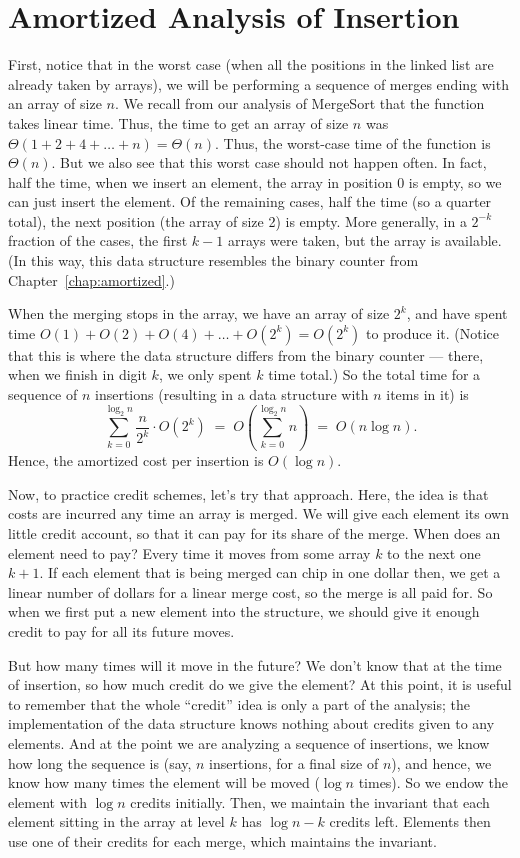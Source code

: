 \section{Amortized Analysis of Insertion}

First, notice that in the worst case (when all the positions in the
linked list are already taken by arrays), we will be performing a
sequence of merges ending with an array of size $n$. 
We recall from our analysis of MergeSort that the 
function takes linear time. Thus, the time to get an array of size $n$
was $\Theta(1+2+4+\ldots+n) = \Theta(n)$.
Thus, the worst-case time of the  function is $\Theta(n)$.
But we also see that this worst case should not happen often.
In fact, half the time, when we insert an element, the array in
position 0 is empty, so we can just insert the element.
Of the remaining cases, half the time (so a quarter total), the next
position (the array of size 2) is empty.
More generally, in a $2^{-k}$ fraction of the cases, the first $k-1$
arrays were taken, but the  array is available.
(In this way, this data structure resembles the binary counter from
Chapter~\ref{chap:amortized}.)

When the merging stops in the  array, we have an array of size
$2^k$, and have spent time $O(1)+O(2)+O(4)+\ldots+O(2^k) = O(2^k)$ to
produce it. (Notice that this is where the data structure differs from
the binary counter --- there, when we finish in digit $k$, we only
spent $k$ time total.) 
So the total time for a sequence of $n$ insertions (resulting in a
data structure with $n$ items in it) is
\[ \sum_{k=0}^{\log_2 n} \frac{n}{2^k} \cdot O(2^k)
\; = \; O(\sum_{k=0}^{\log_2 n} n) \; = \; O(n \log n). \]
Hence, the amortized cost per insertion is $O(\log n)$.

\smallskip

Now, to practice credit schemes, let's try that approach.
Here, the idea is that costs are incurred any time an array is merged. 
We will give each element its own little credit account, so
that it can pay for its share of the merge.
When does an element need to pay? 
Every time it moves from some array $k$ to the next one $k+1$.
If each element that is being merged can chip in one dollar then, we
get a linear number of dollars for a linear merge cost, so the merge
is all paid for. 
So when we first put a new element into the structure, we should give
it enough credit to pay for all its future moves.

But how many times will it move in the future? We don't know that at
the time of insertion, so how much credit do we give the element?
At this point, it is useful to remember that the whole ``credit'' idea
is only a part of the analysis; the implementation of the data
structure knows nothing about credits given to any elements.
And at the point we are analyzing a sequence of insertions, we know
how long the sequence is (say, $n$ insertions, for a final size of $n$), 
and hence, we know how many times the element will be moved ($\log n$
times). So we endow the element with $\log n$ credits initially.
Then, we maintain the invariant that each element sitting in the array
at level $k$ has $\log n - k$ credits left. Elements then use one of
their credits for each merge, which maintains the invariant.

